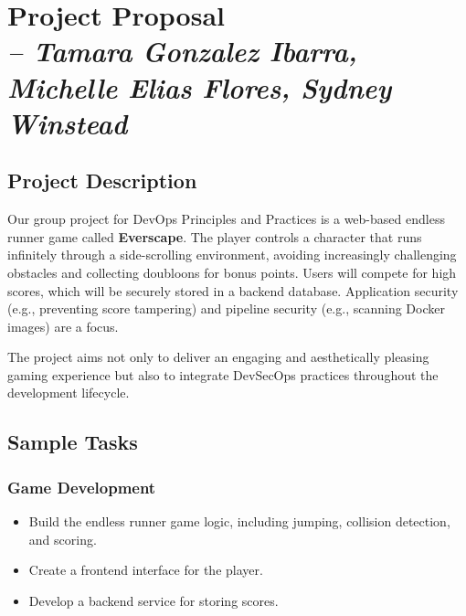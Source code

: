 \chapter{Project Proposal \\
\small{\textit{-- Tamara Gonzalez Ibarra, Michelle Elias Flores, Sydney Winstead}}}
\label{Chapter::itProjectProposal}

\section{Project Description}

Our group project for DevOps Principles and Practices is a web-based endless runner game called \textbf{Everscape}. The player controls a character that runs infinitely through a side-scrolling environment, avoiding increasingly challenging obstacles and collecting doubloons for bonus points. Users will compete for high scores, which will be securely stored in a backend database. Application security (e.g., preventing score tampering) and pipeline security (e.g., scanning Docker images) are a focus.

The project aims not only to deliver an engaging and aesthetically pleasing gaming experience but also to integrate DevSecOps practices throughout the development lifecycle.

\section{Sample Tasks}

\subsection*{Game Development}
\begin{itemize}
    \item Build the endless runner game logic, including jumping, collision detection, and scoring.
    \item Create a frontend interface for the player.
    \item Develop a backend service for storing scores.
\end{itemize}

